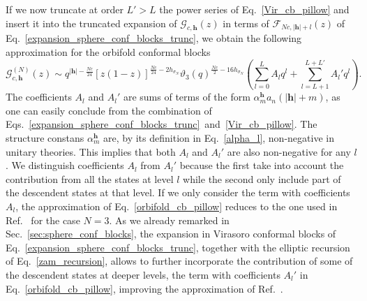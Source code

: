 \documentclass[a4paper,11pt]{article}
\begin{document}
If we now truncate at order $L'>L$ the power series of Eq.~\eqref{Vir_cb_pillow} and insert it into the truncated
expansion of $\mathcal{G}_{c, \boldsymbol{h}}(z)$ in terms of $\mathcal{F}_{Nc, |\boldsymbol{h}|+l}(z)$
of Eq.~\eqref{expansion_sphere_conf_blocks_trunc}, we obtain the following approximation for the orbifold conformal blocks
\begin{equation}\label{orbifold_cb_pillow}
 \mathcal{G}_{c, \boldsymbol{h}}^{(N)}(z)
 \sim q^{|\boldsymbol{h}|-\frac{Nc}{24}}\left[z(1-z)\right]^{\frac{Nc}{24}-2h_{\sigma_N}}
 \vartheta_3(q)^{\frac{Nc}{2}-16h_{\sigma_N}}
 \left(\sum_{l=0}^L A_l q^l+\sum_{l=L+1}^{L+L'} A_l' q^l\right).
\end{equation}
The coefficients $A_l$ and $A_l'$ are sums of terms of the form 
$\alpha_m^{\boldsymbol{h}} a_{n}(|\boldsymbol{h}|+m)$,
as one can easily conclude from the combination of Eqs.~\eqref{expansion_sphere_conf_blocks_trunc}~and~\eqref{Vir_cb_pillow}. 
The structure constans $\alpha_m^{\boldsymbol{h}}$ are, by its definition 
in Eq.~\eqref{alpha_l}, non-negative in unitary theories. This implies that both $A_l$ and $A_l'$ are also 
non-negative for any $l$. We distinguish coefficients $A_l$ from $A_l'$ because the first take into account 
the contribution from all the states at level $l$ while the second only include part of the descendent states at that level.
If we only consider the term with coefficients $A_l$, the approximation of Eq.~\eqref{orbifold_cb_pillow} reduces to the one
used in Ref.~\cite{Collier} for the case $N=3$. As we already remarked in Sec.~\eqref{sec:sphere_conf_blocks}, the expansion
in Virasoro conformal blocks of Eq.~\eqref{expansion_sphere_conf_blocks_trunc}, together with the elliptic recursion of Eq.~\eqref{zam_recursion}, allows to further incorporate the contribution of some of the descendent states at deeper levels, the term with coefficients $A_l'$ in Eq.~\eqref{orbifold_cb_pillow}, improving the approximation of Ref.~\cite{Collier}.
\end{document}
